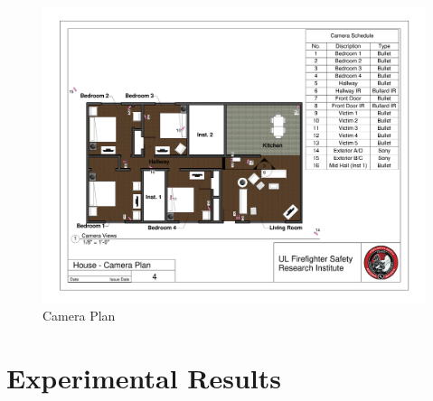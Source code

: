 \documentclass[12pt,oneside]{book}
\begin{document}
\begin{appendices}
\begin{figure}
\includegraphics[width=\textheight]{../0_Images/Appendix_Figures/Camera_Plan}
\caption[]{Camera Plan}
\label{fig:appendix_cameras}
\end{figure}

\chapter{Experimental Results} \label{App:Results}
\renewcommand{\thesubsection}{\Alph{section}}


% 

\end{appendices}
\end{document}

